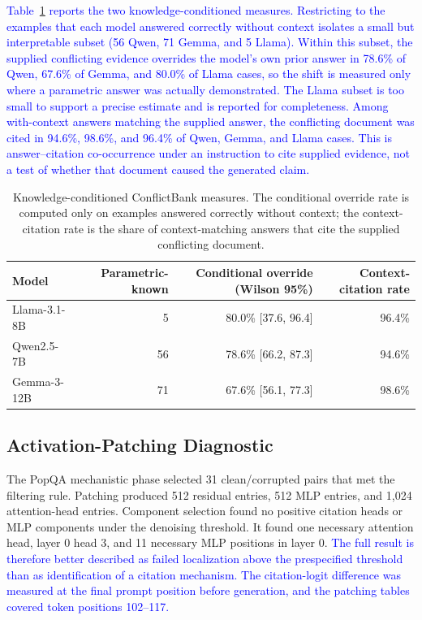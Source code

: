 \documentclass[a4paper,fleqn]{cas-sc}
\begin{document}
\textcolor{blue}{Table~\ref{tab:conflictbank-conditional} reports the two knowledge-conditioned measures. Restricting to the examples that each model answered correctly without context isolates a small but interpretable subset (56 Qwen, 71 Gemma, and 5 Llama). Within this subset, the supplied conflicting evidence overrides the model's own prior answer in 78.6\% of Qwen, 67.6\% of Gemma, and 80.0\% of Llama cases, so the shift is measured only where a parametric answer was actually demonstrated. The Llama subset is too small to support a precise estimate and is reported for completeness. Among with-context answers matching the supplied answer, the conflicting document was cited in 94.6\%, 98.6\%, and 96.4\% of Qwen, Gemma, and Llama cases. This is answer--citation co-occurrence under an instruction to cite supplied evidence, not a test of whether that document caused the generated claim.}

\begin{table}[t]
\centering
\small
\color{blue}
\begin{tabular}{lrrr}
\toprule
Model & Parametric-known & Conditional override (Wilson 95\%) & Context-citation rate \\
\midrule
Llama-3.1-8B & 5 & 80.0\% [37.6, 96.4] & 96.4\% \\
Qwen2.5-7B & 56 & 78.6\% [66.2, 87.3] & 94.6\% \\
Gemma-3-12B & 71 & 67.6\% [56.1, 77.3] & 98.6\% \\
\bottomrule
\end{tabular}
\caption{Knowledge-conditioned ConflictBank measures. The conditional override rate is computed only on examples answered correctly without context; the context-citation rate is the share of context-matching answers that cite the supplied conflicting document.}
\label{tab:conflictbank-conditional}
\end{table}

\subsection{Activation-Patching Diagnostic}

The PopQA mechanistic phase selected 31 clean/corrupted pairs that met the filtering rule. Patching produced 512 residual entries, 512 MLP entries, and 1,024 attention-head entries. Component selection found no positive citation heads or MLP components under the denoising threshold. It found one necessary attention head, layer 0 head 3, and 11 necessary MLP positions in layer 0. \textcolor{blue}{The full result is therefore better described as failed localization above the prespecified threshold than as identification of a citation mechanism. The citation-logit difference was measured at the final prompt position before generation, and the patching tables covered token positions 102--117.}
\end{document}

